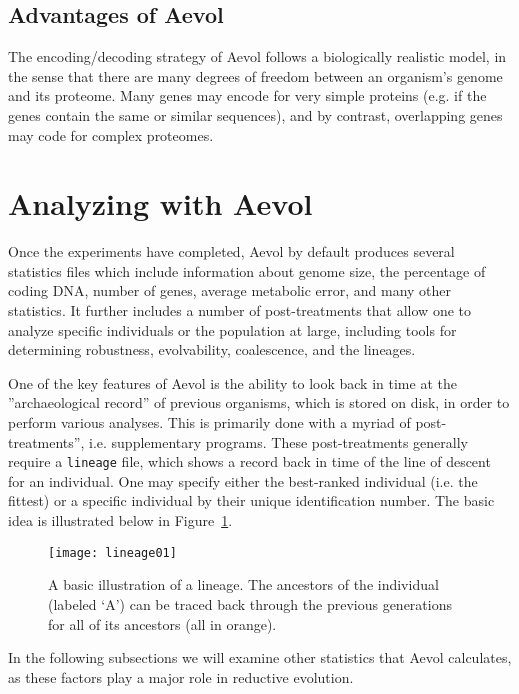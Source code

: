\subsection{Advantages of Aevol}
The encoding/decoding strategy of Aevol follows a biologically realistic model, in the sense that there are many degrees of freedom between an organism's genome and its proteome. Many genes may encode for very simple proteins (e.g. if the genes contain the same or similar sequences), and by contrast, overlapping genes may code for complex proteomes. 

\section{Analyzing with Aevol}\label{aevol_post-treatments}

Once the experiments have completed, Aevol by default produces several statistics files which include information about genome size, the percentage of coding DNA, number of genes, average metabolic error, and many other statistics. It further includes a number of post-treatments that allow one to analyze specific individuals or the population at large, including tools for determining robustness, evolvability, coalescence, and the lineages. 

One of the key features of Aevol is the ability to look back in time at the ''archaeological record'' of previous organisms, which is stored on disk, in order to perform various analyses. This is primarily done with a myriad of post-treatments'', i.e. supplementary programs. These post-treatments generally require a \texttt{lineage} file, which shows a record back in time of the line of descent for an individual. One may specify either the best-ranked individual (i.e. the fittest) or a specific individual by their unique identification number. The basic idea is illustrated below in Figure~\ref{fig:lineage01}. 

\begin{figure}[H]
	\texttt{[image: lineage01]}
	\centering
	\caption[Lineage basic illustration.]{A basic illustration of a lineage. The ancestors of the individual (labeled `A') can be traced back through the previous generations for all of its ancestors (all in orange).}
	\label{fig:lineage01}
\end{figure}

In the following subsections we will examine other statistics that Aevol calculates, as these factors play a major role in reductive evolution. 

